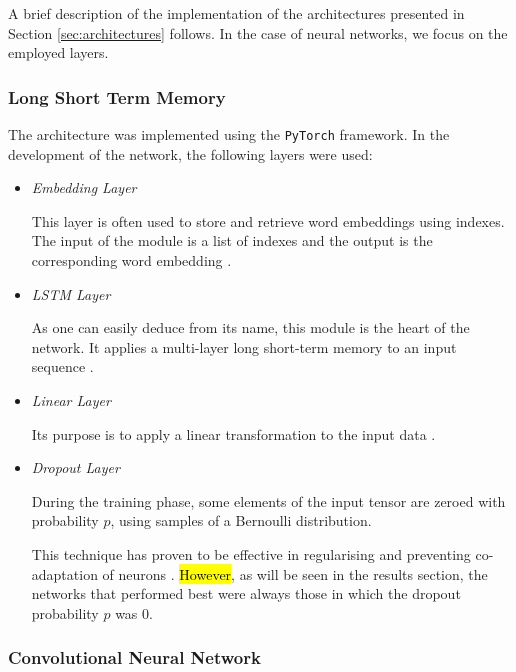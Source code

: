 \documentclass[letterpaper,11pt]{article}
\begin{document}
A brief description of the implementation of the architectures presented in Section \ref{sec:architectures} follows. In the case of neural networks, we focus on the employed layers.

\subsubsection*{Long Short Term Memory}

The architecture was implemented using the \verb|PyTorch| framework. 
In the development of the network, the following layers were used:

\begin{itemize}
  \item \textit{Embedding Layer}
  
  This layer is often used to store and retrieve word embeddings using indexes. The input of the module is a list of indexes and the output is the corresponding word embedding \cite{pytorch_embedding}.
  \item \textit{LSTM Layer}
  
  As one can easily deduce from its name, this module is the heart of the network. It applies a multi-layer long short-term memory to an input sequence \cite{pytorch_lstm}.
  \item \textit{Linear Layer}
  
  Its purpose is to apply a linear transformation to the input data \cite{pytorch_linear}.
  \item \textit{Dropout Layer}
  
  During the training phase, some elements of the input tensor are zeroed with probability $p$, using samples of a Bernoulli distribution.

  This technique has proven to be effective in regularising and preventing co-adaptation of neurons \cite{pytorch_dropout}. \hl{However}, as will be seen in the results section, the networks that performed best were always those in which the dropout probability $p$ was 0. 
\end{itemize}



\subsubsection*{Convolutional Neural Network}
\end{document}
